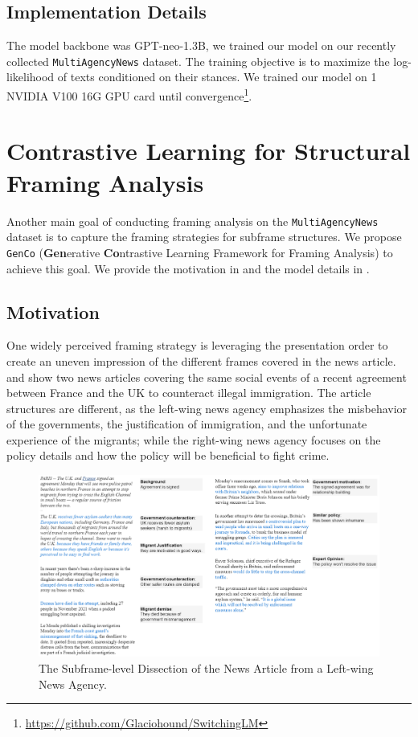 \subsection{Implementation Details}
\label{switch-implement}
The model backbone was GPT-neo-1.3B, we trained our model on our recently collected \texttt{MultiAgencyNews} dataset. The training objective is to maximize the log-likelihood of texts conditioned on their stances. We trained our model on 1 NVIDIA V100 16G GPU card until convergence\footnote{\url{https://github.com/Glaciohound/SwitchingLM}}.


\section{Contrastive Learning for Structural Framing Analysis}
\label{genco}
Another main goal of conducting framing analysis on the \texttt{MultiAgencyNews} dataset is to capture the framing strategies for subframe structures. We propose \texttt{GenCo} (\textbf{Gen}erative \textbf{Co}ntrastive Learning Framework for Framing Analysis) to achieve this goal. We provide the motivation in  and the model details in .

\subsection{Motivation}
\label{genco-motivation}
One widely perceived framing strategy is leveraging the presentation order to create an uneven impression of the different frames covered in the news article.  and  show two news articles covering the same social events of a recent agreement between France and the UK to counteract illegal immigration. The article structures are different, as the left-wing news agency emphasizes the misbehavior of the governments, the justification of immigration, and the unfortunate experience of the migrants; while the right-wing news agency focuses on the policy details and how the policy will be beneficial to fight crime. 
\clearpage

\begin{figure}[ht!]
    \centering
    \includegraphics[width=\textwidth]{img/genco-motivation-left}
    \caption{The Subframe-level Dissection of the News Article from a Left-wing News Agency.}
    \label{fig:genco-motivation-left}
\end{figure}

